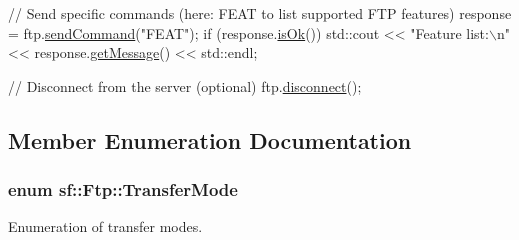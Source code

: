 \begin{DoxyCode}
\textcolor{comment}{// Send specific commands (here: FEAT to list supported FTP features)}
response = ftp.\hyperlink{classsf_1_1_ftp_a44e095103ecbce175a33eaf0820440ff}{sendCommand}(\textcolor{stringliteral}{"FEAT"});
\textcolor{keywordflow}{if} (response.\hyperlink{classsf_1_1_ftp_1_1_response_a4dadbe0fe0a3ef2d571a017e1645e675}{isOk}())
    std::cout << \textcolor{stringliteral}{"Feature list:\(\backslash\)n"} << response.\hyperlink{classsf_1_1_ftp_1_1_response_a0015675c528a4a84a671484b9e5499d6}{getMessage}() << std::endl;

\textcolor{comment}{// Disconnect from the server (optional)}
ftp.\hyperlink{classsf_1_1_ftp_acf7459926f3391cd06bf84337ed6a0f4}{disconnect}();
\end{DoxyCode}
 

\subsection{Member Enumeration Documentation}
\hypertarget{classsf_1_1_ftp_a1cd6b89ad23253f6d97e6d4ca4d558cb}{
\subsubsection[{Transfer\-Mode}]{\setlength{\rightskip}{0pt plus 5cm}enum {\bf sf\-::\-Ftp\-::\-Transfer\-Mode}}}\label{classsf_1_1_ftp_a1cd6b89ad23253f6d97e6d4ca4d558cb}


Enumeration of transfer modes. 

